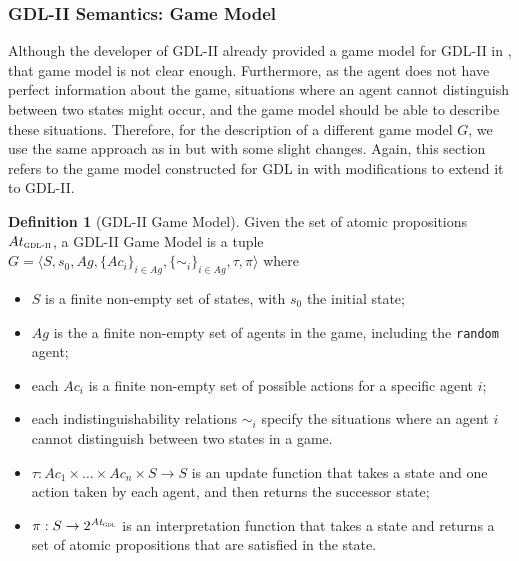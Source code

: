 \documentclass{article}
\theoremstyle{theorem}
\theoremstyle{lemma}
\theoremstyle{definition}
\newtheorem{definition}{Definition}[section]
\theoremstyle{remark}
\begin{document}
\subsubsection{GDL-II Semantics: Game Model}

Although the developer of GDL-II already provided a game model for
GDL-II in \citep{gdlii}, that game model is not clear
enough. Furthermore, as the agent does not have perfect information
about the game, situations where an agent cannot distinguish between
two states might occur, and the game model should be able to describe
these situations. Therefore, for the description of a different game
model $G$, we use the same approach as in \citep{GDLpaper} but
with some slight changes. Again, this section refers to the game model
constructed for GDL in \citep{GDLpaper} with modifications to extend
it to GDL-II.
\begin{definition}[GDL-II Game Model]
    Given the set of atomic propositions $At_\textsc{gdl-ii}$, a GDL-II Game Model is a tuple
        $G  =  \langle S, s_{0}, Ag, \{Ac_{i}\}_{i \in Ag}, \allowbreak \{ \sim_i \}_{i \in Ag}, \tau, \pi \rangle$
    where
    \begin{itemize}
        \item $S$ is a finite non-empty set of states, with $s_{0}$ the initial state;
      \item $Ag$ is the a finite non-empty set of agents in the game, including the \texttt{random} agent;
      \item each $Ac_{i}$ is a finite non-empty set of possible actions for a specific agent $i$;
       \item each indistinguishability relations $\sim_i$ specify the situations where an agent $i$ cannot distinguish between two states in a game.
      \item $\tau: Ac_{1}\times  \ldots \times Ac_{n} \times S \rightarrow S$ is an update function that takes a state and one action taken by each agent, and then returns the successor state;
      \item $\pi:S \rightarrow 2\textsuperscript{\textit{At}\textsubscript{\textsc{gdl}}}$ is an interpretation function that takes a state and returns a set of atomic propositions that are satisfied in the state.
    \end{itemize}
\end{definition}
\end{document}
